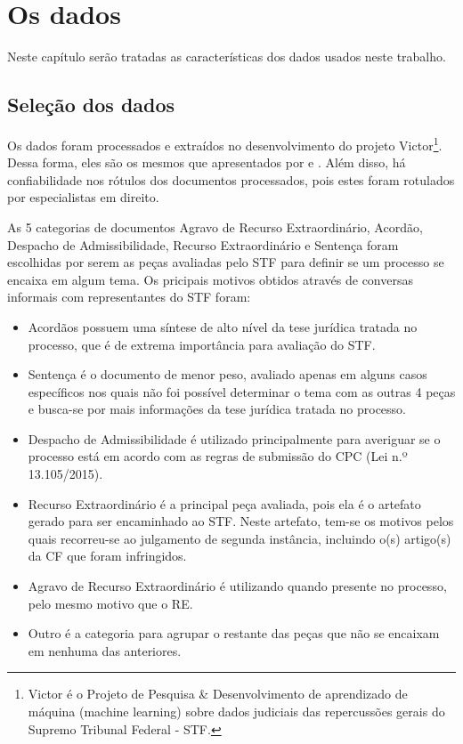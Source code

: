\chapter[Os dados]{Os dados}
\label{sec:dados}

Neste capítulo serão tratadas as características dos dados usados neste trabalho.

\section{Seleção dos dados}

Os dados foram processados e extraídos no desenvolvimento do projeto Victor\footnote{Victor é o Projeto de Pesquisa \& Desenvolvimento de aprendizado de máquina (machine learning) sobre dados judiciais das repercussões gerais do Supremo Tribunal Federal - STF.}. Dessa forma, eles são os mesmos que apresentados por   e . Além disso, há confiabilidade nos rótulos dos documentos processados, pois estes foram rotulados por especialistas em direito.

As 5 categorias de documentos Agravo de Recurso Extraordinário, Acordão, Despacho de Admissibilidade, Recurso Extraordinário e Sentença foram escolhidas por serem as peças avaliadas pelo STF para definir se um processo se encaixa em algum tema. Os pricipais motivos obtidos através de conversas informais com representantes do STF foram:

\begin{itemize}
    \item Acordãos possuem uma síntese de alto nível da tese jurídica tratada no processo, que é de extrema importância para avaliação do STF.
    \item Sentença é o documento de menor peso, avaliado apenas em alguns casos específicos nos quais não foi possível determinar o tema com as outras 4 peças e busca-se por mais informações da tese jurídica tratada no processo.
    \item Despacho de Admissibilidade é utilizado principalmente para averiguar se o processo está em acordo com as regras de submissão do CPC (Lei n.º 13.105/2015).
    \item Recurso Extraordinário é a principal peça avaliada, pois ela é o artefato gerado para ser encaminhado ao STF. Neste artefato, tem-se os motivos pelos quais recorreu-se ao julgamento de segunda instância, incluindo o(s) artigo(s) da CF \citeyear{brasil_constituicao_1988} que foram infringidos.
    \item Agravo de Recurso Extraordinário é utilizando quando presente no processo, pelo mesmo motivo que o RE.
    \item Outro é a categoria para agrupar o restante das peças que não se encaixam em nenhuma das anteriores.
\end{itemize}

